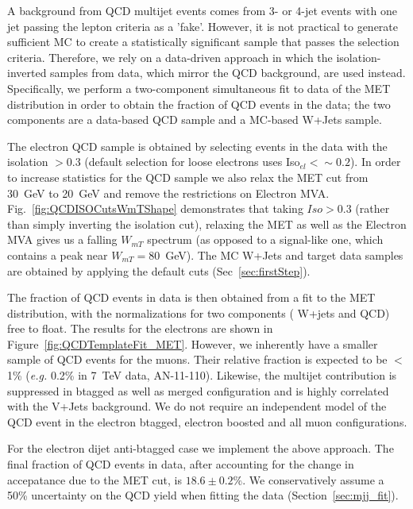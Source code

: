A background from QCD multijet events comes from 3- or 4-jet events
with one jet passing the lepton criteria as a 'fake'. However, it is
not practical to generate sufficient MC to create a statistically
significant sample that passes the selection criteria. Therefore, we
rely on a data-driven approach in which the isolation-inverted samples
from data, which mirror the QCD background, are used instead.
Specifically, we perform a two-component simultaneous fit to data of
the MET distribution in order to obtain the fraction of QCD events in
the data; the two components are a data-based QCD sample and a
MC-based W+Jets sample.

The electron QCD sample is obtained by selecting events
in the data with the isolation $>0.3$ (default selection for loose
electrons uses Iso$_{el}<\sim0.2$).  In order to increase statistics
for the QCD sample we also relax the MET cut from 30~GeV to 20~GeV and
remove the restrictions on Electron MVA.
Fig.~\ref{fig:QCDISOCutsWmTShape} demonstrates that taking $Iso>0.3$
(rather than simply inverting the isolation cut), relaxing the MET as
well as the Electron MVA gives us a falling $W_{mT}$ spectrum (as
opposed to a signal-like one, which contains a peak near
$W_{mT}=$80~GeV). The MC W+Jets and target data samples are obtained by
applying the default cuts (Sec~\ref{sec:firstStep}).

The fraction of QCD events in data is then obtained from a
fit to the MET distribution, with the normalizations for two components (
W+jets and QCD) free to float.
The results for the electrons are shown in Figure~\ref{fig:QCDTemplateFit_MET}. 
However, we inherently have a smaller sample of 
QCD events for the muons. Their relative fraction
is expected to be $<$1\% ({\it e.g.} 0.2\% in 7~TeV data, AN-11-110).
Likewise, the multijet contribution is suppressed in btagged as well as merged configuration and is highly correlated with the V+Jets background.
We do not require an independent model of the QCD event in the electron btagged, electron boosted and all muon configurations.

For the electron dijet anti-btagged case we implement the above approach. The final fraction of QCD events in data, after accounting for the change in accepatance due to the MET cut,
is $18.6\pm 0.2\%$. We conservatively assume a 50\% uncertainty on the QCD yield when fitting the data (Section~\ref{sec:mjj_fit}).


